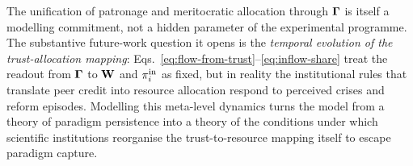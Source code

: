 The unification of patronage and meritocratic allocation through
$\boldsymbol{\Gamma}$ is itself a modelling commitment, not a hidden parameter
of the experimental programme. The substantive future-work question it
opens is the \emph{temporal evolution of the trust-allocation
mapping}: Eqs.~\eqref{eq:flow-from-trust}--\eqref{eq:inflow-share}
treat the readout from $\boldsymbol{\Gamma}$ to $\mathbf{W}$ and $\pi^{\mathrm{in}}_{i}$
as fixed, but in reality the institutional rules that translate peer
credit into resource allocation respond to perceived crises and
reform episodes. Modelling this meta-level dynamics turns the model
from a theory of paradigm persistence into a theory of the conditions
under which scientific institutions reorganise the trust-to-resource
mapping itself to escape paradigm capture.
